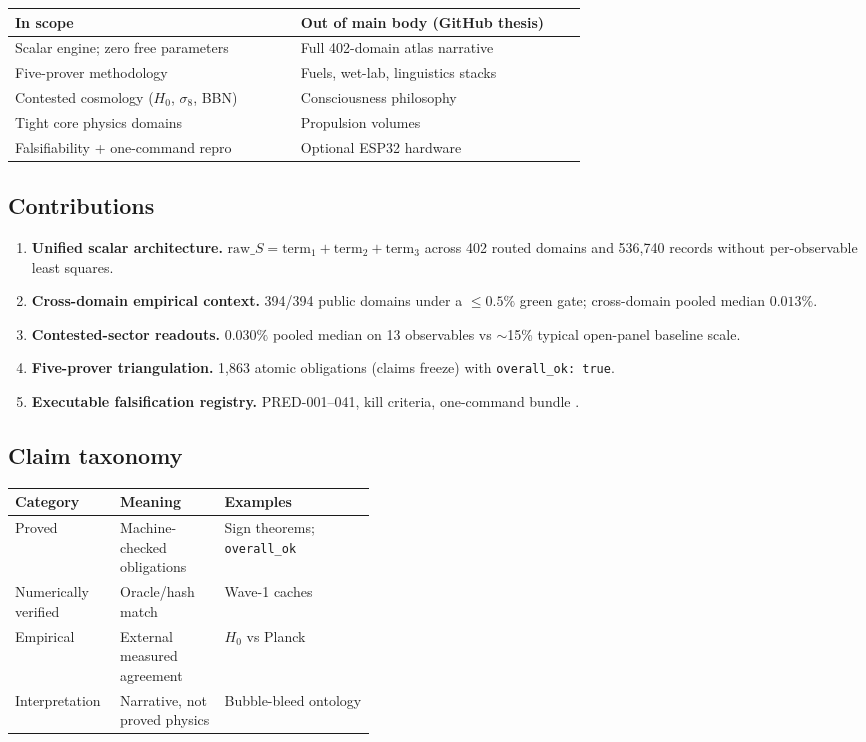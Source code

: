 \documentclass[11pt,a4paper]{article}
\begin{document}
\begin{center}
\begin{tabular}{@{}p{0.45\linewidth}p{0.45\linewidth}@{}}
\toprule
\textbf{In scope} & \textbf{Out of main body (GitHub thesis)} \\
\midrule
Scalar engine; zero free parameters & Full 402-domain atlas narrative \\
Five-prover methodology & Fuels, wet-lab, linguistics stacks \\
Contested cosmology ($H_0$, $\sigma_8$, BBN) & Consciousness philosophy \\
Tight core physics domains & Propulsion volumes \\
Falsifiability + one-command repro & Optional ESP32 hardware \\
\bottomrule
\end{tabular}
\end{center}

\subsection{Contributions}

\begin{enumerate}[leftmargin=*]
\item \textbf{Unified scalar architecture.}
  $\mathrm{raw}\_S=\mathrm{term}_1+\mathrm{term}_2+\mathrm{term}_3$ across
  402 routed domains and 536{,}740 records without per-observable least squares.
\item \textbf{Cross-domain empirical context.}
  394/394 public domains under a $\le 0.5\%$ green gate; cross-domain pooled
  median $0.013\%$.
\item \textbf{Contested-sector readouts.}
  $0.030\%$ pooled median on 13 observables vs $\sim$15\% typical open-panel
  baseline scale.
\item \textbf{Five-prover triangulation.}
  1{,}863 atomic obligations (claims freeze) with \texttt{overall\_ok: true}.
\item \textbf{Executable falsification registry.}
  PRED-001--041, kill criteria, one-command bundle
  \cite{FSOT21Lean}.
\end{enumerate}

\subsection{Claim taxonomy}

\begin{center}
\begin{tabular}{@{}llp{0.42\linewidth}@{}}
\toprule
Category & Meaning & Examples \\
\midrule
Proved & Machine-checked obligations & Sign theorems; \texttt{overall\_ok} \\
Numerically verified & Oracle/hash match & Wave-1 caches \\
Empirical & External measured agreement & $H_0$ vs Planck \\
Interpretation & Narrative, not proved physics & Bubble-bleed ontology \\
\bottomrule
\end{tabular}
\end{center}
\end{document}
